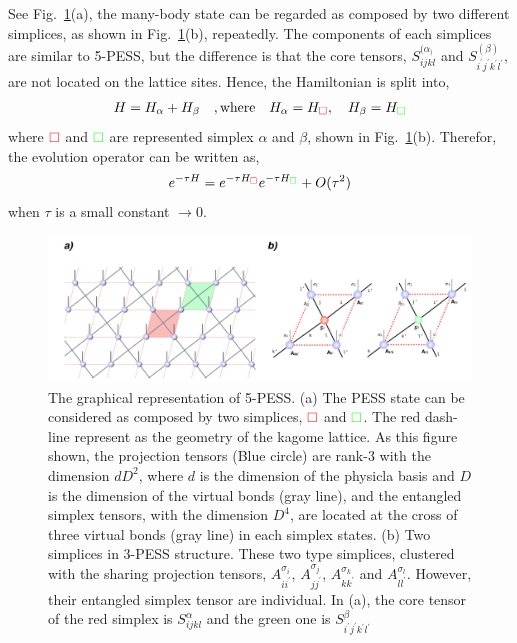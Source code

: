 See Fig.~\ref{fig4325}(a), the many-body state can be regarded as composed by two different simplices, as shown in Fig.~\ref{fig4325}(b), repeatedly. The components of each simplices are similar to 5-PESS, but the difference is that the core tensors, $S^{(\alpha_)}_{ijkl}$ and $S^{(\beta)}_{i^{\prime}j^{\prime}k^{\prime}l^{\prime}}$, are not located on the lattice sites. Hence, the Hamiltonian is split into,
\begin{align}
	H = H_{\alpha} + H_{\beta} \quad,\text{where} \quad H_{\alpha} = H_{\color{red} \square},\quad H_{\beta} = H_{\color{green} \square}
\end{align}
where ${\color{red} \square}$ and ${\color{green} \square}$ are represented simplex $\alpha$ and $\beta$, shown in Fig.~\ref{fig4325}(b). Therefor, the evolution operator can be written as, 
\begin{align}
	e^{-\tau H} = e^{-\tau H_{\color{red} \square}} e^{-\tau H_{ \color{green} \square}} + O(\tau^2)
\end{align}
when $\tau$ is a small constant $\rightarrow 0$.
\begin{figure}[ht]
	\centering
	\includegraphics[width=1.00\textwidth]{figures/fig4325.png}
	\caption[The graphical representation of 5-PESS]{The graphical representation of 5-PESS. (a) The PESS state can be considered as composed by two simplices, ${\color{red} \square}$ and ${\color{green} \square}$. The red dash-line represent as the geometry of the kagome lattice. As this figure shown, the projection tensors (Blue circle) are rank-3 with the dimension $dD^2$, where $d$ is the dimension of the physicla basis and $D$ is the dimension of the virtual bonds (gray line), and the entangled simplex tensors, with the dimension $D^4$, are located at the cross of three virtual bonds (gray line) in each simplex states. (b) Two simplices in 3-PESS structure. These two type simplices, clustered with the sharing projection tensors, $A^{\sigma_i}_{ii^{\prime}}$, $A^{\sigma_j}_{jj^{\prime}}$, $A^{\sigma_k}_{kk^{\prime}}$ and $A^{\sigma_l}_{ll^{\prime}}$. However, their entangled simplex tensor are individual. In (a), the core tensor of the red simplex is $S^{\alpha}_{ijkl}$ and the green one is $S^{\beta}_{i^{\prime}j^{\prime}k^{\prime}l^{\prime}}$}
	\label{fig4325}
\end{figure}

